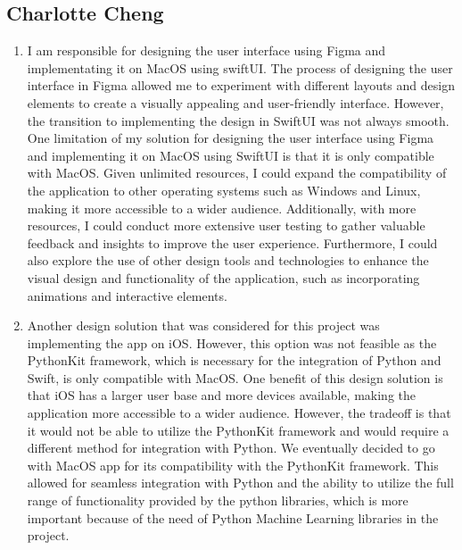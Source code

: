 \documentclass[12pt, titlepage]{article}
\begin{document}
\subsection{Charlotte Cheng}
\begin{enumerate}
    \item I am responsible for designing the user interface using Figma and implementating it on MacOS using swiftUI. The process of designing the user interface in Figma allowed me to experiment with different layouts and design elements to create a visually appealing and user-friendly interface. However, the transition to implementing the design in SwiftUI was not always smooth. One limitation of my solution for designing the user interface using Figma and implementing it on MacOS using SwiftUI is that it is only compatible with MacOS. Given unlimited resources, I could expand the compatibility of the application to other operating systems such as Windows and Linux, making it more accessible to a wider audience. Additionally, with more resources, I could conduct more extensive user testing to gather valuable feedback and insights to improve the user experience. Furthermore, I could also explore the use of other design tools and technologies to enhance the visual design and functionality of the application, such as incorporating animations and interactive elements.
    \item Another design solution that was considered for this project was implementing the app on iOS. However, this option was not feasible as the PythonKit framework, which is necessary for the integration of Python and Swift, is only compatible with MacOS. One benefit of this design solution is that iOS has a larger user base and more devices available, making the application more accessible to a wider audience. However, the tradeoff is that it would not be able to utilize the PythonKit framework and would require a different method for integration with Python. We eventually decided to go with MacOS app for its compatibility with the PythonKit framework. This allowed for seamless integration with Python and the ability to utilize the full range of functionality provided by the python libraries, which is more important because of the need of Python Machine Learning libraries in the project. 
\end{enumerate}
\end{document}
